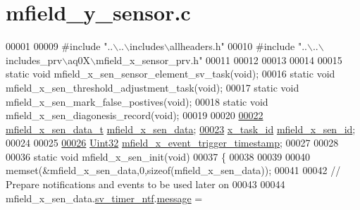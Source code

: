 \hypertarget{a00052_source}{\section{mfield\+\_\+y\+\_\+sensor.\+c}
\label{a00052_source}
}

\begin{DoxyCode}
00001 
00009 \textcolor{preprocessor}{#include "..\(\backslash\)..\(\backslash\)includes\(\backslash\)allheaders.h"}
00010 \textcolor{preprocessor}{#include "..\(\backslash\)..\(\backslash\)includes\_prv\(\backslash\)aq0X\(\backslash\)mfield\_x\_sensor\_prv.h"}
00011 
00012 
00013 
00014 
00015 \textcolor{keyword}{static} \textcolor{keywordtype}{void}             mfield\_x\_sen\_sensor\_element\_sv\_task(\textcolor{keywordtype}{void});
00016 \textcolor{keyword}{static} \textcolor{keywordtype}{void}             mfield\_x\_sen\_threshold\_adjustment\_task(\textcolor{keywordtype}{void});
00017 \textcolor{keyword}{static} \textcolor{keywordtype}{void}             mfield\_x\_sen\_mark\_false\_postives(\textcolor{keywordtype}{void});
00018 \textcolor{keyword}{static} \textcolor{keywordtype}{void}             mfield\_x\_sen\_diagonesis\_record(\textcolor{keywordtype}{void});
00019 
00020 
\hypertarget{a00052_source_l00022}{}\hyperlink{a00052_af8c531b1ba5fea148fb9111e06058f92}{00022} \hyperlink{a00025_d8/de9/a00595}{mfield\_x\_sen\_data\_t} \hyperlink{a00052_af8c531b1ba5fea148fb9111e06058f92}{mfield\_x\_sen\_data};
\hypertarget{a00052_source_l00023}{}\hyperlink{a00052_a19a33e680bf19d1aed76750132ed8b64}{00023} \hyperlink{a00036_ad5c3c5fbfd3e4aadf22830395484a71d}{x\_task\_id}        \hyperlink{a00052_a19a33e680bf19d1aed76750132ed8b64}{mfield\_x\_sen\_id};
00024 
00025 
\hypertarget{a00052_source_l00026}{}\hyperlink{a00052_acb61c9078ac98b44c42bf119521b18b0}{00026} \hyperlink{a00072_aba99025e657f892beb7ff31cecf64653}{Uint32}           \hyperlink{a00052_acb61c9078ac98b44c42bf119521b18b0}{mfield\_x\_event\_trigger\_timestamp};
00027 
00028 
00036  \textcolor{keyword}{static} \textcolor{keywordtype}{void} mfield\_x\_sen\_init(\textcolor{keywordtype}{void})
00037 \{
00038 
00039 
00040     memset(&mfield\_x\_sen\_data,0,\textcolor{keyword}{sizeof}(mfield\_x\_sen\_data));
00041 
00042     \textcolor{comment}{// Prepare notifications and events to be used later on}
00043 
00044     mfield\_x\_sen\_data.\hyperlink{a00025_ada91b200053f2d93e3639dc4ee3415b4}{sv\_timer\_ntf}.\hyperlink{a00036_adf9665938515a20c283eea2c978cf80d}{message}                             = 

\end{DoxyCode}
